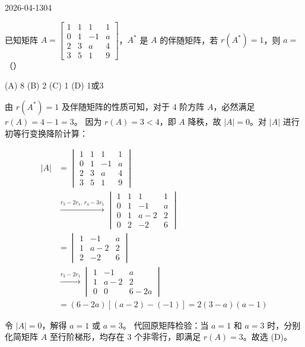 \begin{mistake}{2026-04-13}{04}

\begin{problemcontent}
已知矩阵 \(A = \begin{bmatrix} 1 & 1 & 1 & 1 \\ 0 & 1 & -1 & a \\ 2 & 3 & a & 4 \\ 3 & 5 & 1 & 9 \end{bmatrix}\)，\(A^*\) 是 \(A\) 的伴随矩阵，若 \(r(A^*) = 1\)，则 \(a =\) （\quad）

(A) 8 \qquad (B) 2 \qquad (C) 1 \qquad (D) 1或3
\end{problemcontent}

\begin{solutioncontent}
由 \(r(A^*) = 1\) 及伴随矩阵的性质可知，对于 4 阶方阵 \(A\)，必然满足 \(r(A) = 4 - 1 = 3\)。
因为 \(r(A) = 3 < 4\)，即 \(A\) 降秩，故 \(|A| = 0\)。对 \(|A|\) 进行初等行变换降阶计算：

\[
\begin{aligned}
|A| &= \begin{vmatrix} 1 & 1 & 1 & 1 \\ 0 & 1 & -1 & a \\ 2 & 3 & a & 4 \\ 3 & 5 & 1 & 9 \end{vmatrix} \\
&\xrightarrow{r_3-2r_1,\, r_4-3r_1} \begin{vmatrix} 1 & 1 & 1 & 1 \\ 0 & 1 & -1 & a \\ 0 & 1 & a-2 & 2 \\ 0 & 2 & -2 & 6 \end{vmatrix} \\
&= \begin{vmatrix} 1 & -1 & a \\ 1 & a-2 & 2 \\ 2 & -2 & 6 \end{vmatrix} \\
&\xrightarrow{r_3-2r_1} \begin{vmatrix} 1 & -1 & a \\ 1 & a-2 & 2 \\ 0 & 0 & 6-2a \end{vmatrix} \\
&= (6-2a)[(a-2)-(-1)] = 2(3-a)(a-1)
\end{aligned}
\]

令 \(|A| = 0\)，解得 \(a = 1\) 或 \(a = 3\)。
代回原矩阵检验：当 \(a=1\) 和 \(a=3\) 时，分别化简矩阵 \(A\) 至行阶梯形，均存在 3 个非零行，即满足 \(r(A)=3\)。故选 (D)。
\end{solutioncontent}


\end{mistake}
